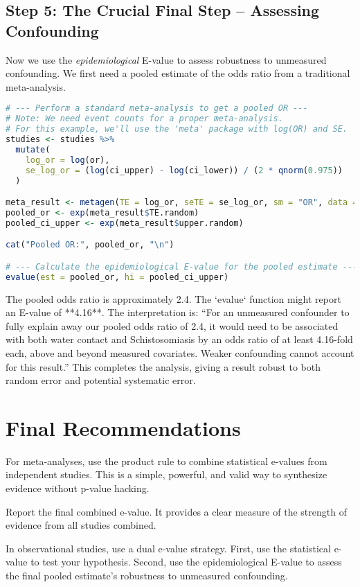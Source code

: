 \documentclass[11pt]{article}
\begin{document}
\subsection*{Step 5: The Crucial Final Step – Assessing Confounding}
Now we use the \textit{epidemiological} E-value to assess robustness to unmeasured confounding. We first need a pooled estimate of the odds ratio from a traditional meta-analysis.

\begin{lstlisting}[language=R]
# --- Perform a standard meta-analysis to get a pooled OR ---
# Note: We need event counts for a proper meta-analysis.
# For this example, we'll use the 'meta' package with log(OR) and SE.
studies <- studies %>%
  mutate(
    log_or = log(or),
    se_log_or = (log(ci_upper) - log(ci_lower)) / (2 * qnorm(0.975))
  )

meta_result <- metagen(TE = log_or, seTE = se_log_or, sm = "OR", data = studies)
pooled_or <- exp(meta_result$TE.random)
pooled_ci_upper <- exp(meta_result$upper.random)

cat("Pooled OR:", pooled_or, "\n")

# --- Calculate the epidemiological E-value for the pooled estimate ---
evalue(est = pooled_or, hi = pooled_ci_upper)
\end{lstlisting}
The pooled odds ratio is approximately 2.4. The `evalue` function might report an E-value of **4.16**. The interpretation is: ``For an unmeasured confounder to fully explain away our pooled odds ratio of 2.4, it would need to be associated with both water contact and Schistosomiasis by an odds ratio of at least 4.16-fold each, above and beyond measured covariates. Weaker confounding cannot account for this result.'' This completes the analysis, giving a result robust to both random error and potential systematic error.

\section*{Final Recommendations}
\begin{notebox}
For meta-analyses, use the product rule to combine statistical e-values from independent studies. This is a simple, powerful, and valid way to synthesize evidence without p-value hacking.
\end{notebox}

\begin{notebox}
Report the final combined e-value. It provides a clear measure of the strength of evidence from all studies combined.
\end{notebox}

\begin{notebox}
In observational studies, use a dual e-value strategy. First, use the statistical e-value to test your hypothesis. Second, use the epidemiological E-value to assess the final pooled estimate's robustness to unmeasured confounding.
\end{notebox}
\end{document}
